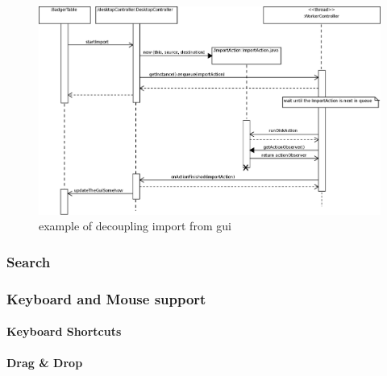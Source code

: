 \begin{figure}[h!]
\centering
\includegraphics[width=1\textwidth]{figures/single_threaded_access.eps}
\caption{example of decoupling import from gui}
\label{fig:decouple_threads}
\end{figure}

\subsubsection{Search}


\subsubsection{Keyboard and Mouse support}

\paragraph{Keyboard Shortcuts}
\paragraph{Drag \& Drop}